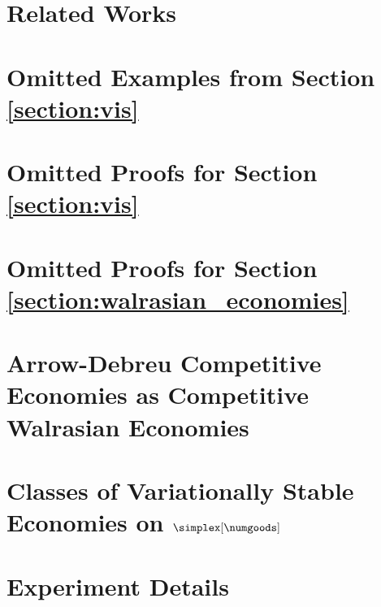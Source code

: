 \section{Related Works}\label{sec_app:related}


\section{Omitted Examples from Section \ref{section:vis}}\label{sec_app:vi_examples}


\section{Omitted Proofs for Section \ref{section:vis}}\label{sec_app:vis}


\section{Omitted Proofs for Section \ref{section:walrasian_economies}}\label{sec_app:walrasian}


\section{Arrow-Debreu Competitive Economies as Competitive Walrasian Economies}\label{sec_app:ad_comp}


\section{Classes of Variationally Stable Economies on $\simplex[\numgoods]$}\label{sec_app:var_stable_classes}


\section{Experiment Details}\label{sec_ap:experiments}
